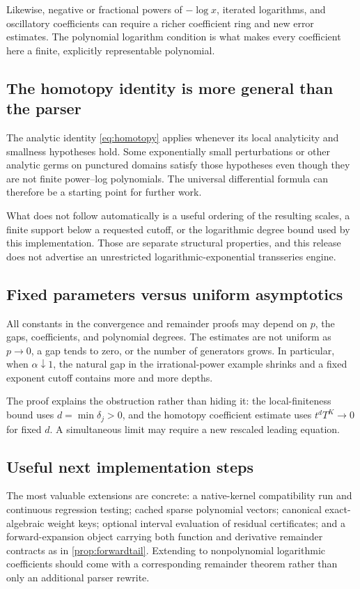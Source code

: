 \documentclass[11pt,a4paper]{article}
\theoremstyle{definition}
\theoremstyle{remark}
\begin{document}
Likewise, negative or fractional powers of $-\log x$, iterated logarithms,
and oscillatory coefficients can require a richer coefficient ring and new
error estimates. The polynomial logarithm condition is what makes every
coefficient here a finite, explicitly representable polynomial.

\subsection{The homotopy identity is more general than the parser}

The analytic identity \eqref{eq:homotopy} applies whenever its local analyticity
and smallness hypotheses hold. Some exponentially small perturbations or
other analytic germs on punctured domains satisfy those hypotheses even
though they are not finite power--log polynomials. The universal differential
formula can therefore be a starting point for further work.

What does not follow automatically is a useful ordering of the resulting
scales, a finite support below a requested cutoff, or the logarithmic degree
bound used by this implementation. Those are separate structural properties,
and this release does not advertise an unrestricted logarithmic-exponential
transseries engine.

\subsection{Fixed parameters versus uniform asymptotics}

All constants in the convergence and remainder proofs may depend on $p$, the
gaps, coefficients, and polynomial degrees. The estimates are not uniform as
$p\to0$, a gap tends to zero, or the number of generators grows. In particular,
when $\alpha\downarrow1$, the natural gap in the irrational-power example
shrinks and a fixed exponent cutoff contains more and more depths.

The proof explains the obstruction rather than hiding it: the local-finiteness
bound uses $d=\min\delta_j>0$, and the homotopy coefficient estimate uses
$t^dT^K\to0$ for fixed $d$. A simultaneous limit may require a new rescaled
leading equation.

\subsection{Useful next implementation steps}

The most valuable extensions are concrete: a native-kernel compatibility run
and continuous regression testing; cached sparse polynomial vectors;
canonical exact-algebraic weight keys; optional interval evaluation of
residual certificates; and a forward-expansion object carrying both function
and derivative remainder contracts as in \cref{prop:forwardtail}. Extending to
nonpolynomial logarithmic coefficients should come with a corresponding
remainder theorem rather than only an additional parser rewrite.
\end{document}
